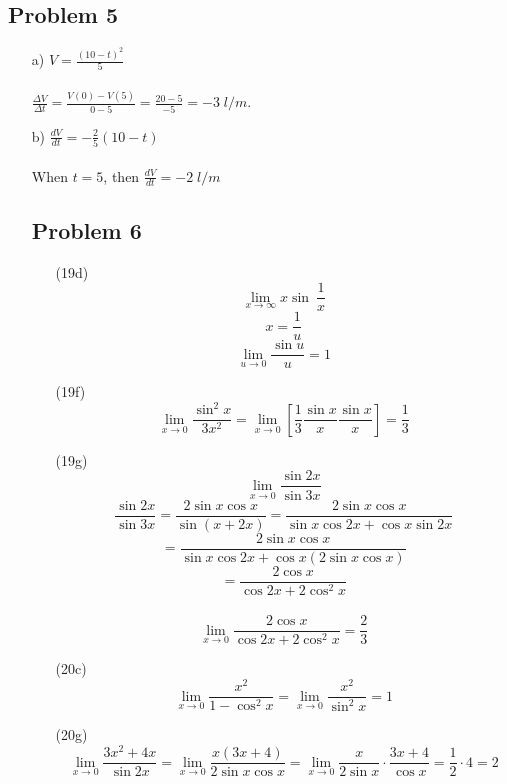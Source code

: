 \documentclass{article}
\begin{document}
\subsection{Problem 5}
\begin{itemize}
\item[a)] 
$V = \frac{(10-t)^2}{5}$ \\ \\ 
$\frac{\Delta V}{\Delta t} = \frac{V(0) - V(5)}{0 - 5} = \frac{20 - 5}{-5} = -3\; l/m$.

\item[b)]
$\frac{dV}{dt} = -\frac{2}{5}(10-t)$ \\ \\
When $t = 5$, then $\frac{dV}{dt} = -2\; l/m$

\subsection{Problem 6}

\begin{itemize}
\item[(19d)] 
\[\lim_{x\to \infty}x\sin\ \frac{1}{x}\]
\[x = \frac{1}{u}\]
\[\lim_{u\to 0}\frac{\sin u}{u} = 1\]

\item[(19f)]
\[\lim_{x \to 0}\frac{\sin^2 x}{3x^2} = \lim_{x \to 0}\left[ \frac{1}{3}\frac{\sin x}{x}\frac{\sin x}{x} \right] = \frac{1}{3}\]

\item[(19g)]
\[ \lim_{x \to 0} \frac{\sin 2x}{\sin 3x}  \]
\[ \frac{\sin 2x}{\sin 3x} = \frac{2 \sin x \cos x}{\sin (x + 2x)} = \frac{2 \sin x \cos x}{\sin x \cos 2x + \cos x \sin 2x} \]
\[ = \frac{2 \sin x \cos x}{\sin x \cos 2x + \cos x (2 \sin x \cos x)} \]
\[ = \frac{2 \cos x}{\cos 2x + 2 \cos^2 x} \]
\\
\[ \lim_{x \to 0} \frac{2 \cos x}{\cos 2x + 2 \cos^2 x} = \frac{2}{3}\]

\item[(20c)]
\[ \lim_{x \to 0} \frac{x^2}{1 - \cos^2 x} =  \lim_{x \to 0} \frac{x^2}{\sin^2 x} = 1\]

\item[(20g)]
\[
\lim_{x \to 0} \frac{3x^2+4x}{\sin 2x} = \lim_{x \to 0} \frac{x(3x+4)}{2 \sin x \cos x} = \lim_{x \to 0} \frac{x}{2 \sin x} \cdot \frac{3x + 4}{\cos x} = \frac{1}{2} \cdot 4 = 2
\]


\end{itemize}
\end{itemize}
\end{document}
